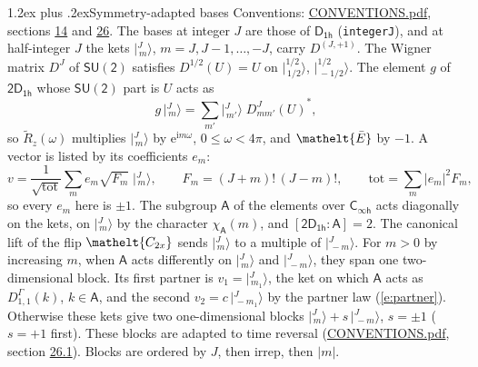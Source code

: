 \documentclass[10pt,a4paper]{article}
\makeatletter
\renewcommand\section{\@startsection{section}{1}{\z@}{-3ex plus -1ex minus -.2ex}%
  {1.2ex plus .2ex}{\normalfont\large\sffamily\bfseries\color{parttitle}}}
\numberwithin{equation}{section}
\newcommand{\eltfont}[1]{{\let\sigma\eltsigma\mathelt{#1}}}
\newcommand{\grp}[1]{\mathsf{#1}}
\newcommand{\elt}[1]{\eltfont{#1}}
\newcommand{\grpindex}[2]{[#1 : #2]}
\newcommand{\iunit}{\mathrm{i}}
\newcommand{\expe}{\mathrm{e}}
\newcommand{\irrJp}[2]{D^{(#1,#2)}}
\newcommand{\repD}[1]{D^{#1}}
\newcommand{\wignerD}[1]{D^{#1}}
\newcommand{\chiA}{\chi_{\grp{A}}}
\newcommand{\conj}[1]{{#1}^{*}}
\newcommand{\jm}[2]{\bigl\lvert{}^{#1}_{\,#2}\bigr\rangle}
\newcommand{\barred}[1]{\bar{#1}}
\newcommand{\lift}[1]{\tilde{#1}}
\makeatother
\begin{document}
\section{Symmetry-adapted bases}\label{s:bases}
Conventions: \href{../../CONVENTIONS.pdf}{CONVENTIONS.pdf}, sections \href{../../../rotation/CONVENTIONS.pdf\#conv.14}{14} and \href{../../CONVENTIONS.pdf\#conv.26}{26}.
\leavevmode\label{n:index.m}\label{n:vector.ket}The bases at integer $J$ are those of \href{../../../rotation/data/pdf/D1h.pdf}{$\grp{D_{1h}}$} (\texttt{integerJ}), and at half-integer $J$ the kets $\jm{J}{m}$, $m = J, J-1, \dots, -J$, carry $\irrJp{J}{+1}$. \label{n:matrix.wigner}The Wigner matrix $\wignerD{J}$ of $\grp{SU(2)}$ satisfies $\wignerD{1/2}(U) = U$ on $\jm{1/2}{1/2}$, $\jm{1/2}{-1/2}$. The element $g$ of $\grp{2D_{1h}}$ whose $\grp{SU(2)}$ part is $U$ acts as
\begin{equation}\label{e:action}g\,\jm{J}{m} = \sum_{m'} \jm{J}{m'}\; \conj{\wignerD{J}_{m m'}(U)},\end{equation}
so $\lift{R}_{z}(\omega)$ multiplies $\jm{J}{m}$ by $\expe^{\iunit m\omega}$, $0 \le \omega < 4\pi$, and $\elt{\barred{E}}$ by $-1$. \label{n:index.ketcoefficient}\label{n:vector.basis.symmetry}\label{n:index.ketweight}\label{n:index.total}A vector is listed by its coefficients $e_m$:
\begin{equation}\label{e:ket}v = \frac{1}{\sqrt{\mathrm{tot}}}\sum_m e_m\sqrt{F_m}\;\jm{J}{m},\qquad F_m = (J+m)!\,(J-m)!,\qquad \mathrm{tot} = \sum_m |e_m|^2F_m,\end{equation}
so every $e_m$ here is $\pm 1$.
\leavevmode\label{n:group.A}\label{n:function.character.abelian}The subgroup $\grp{A}$ of the elements over $\grp{C_{\infty h}}$ acts diagonally on the kets, on $\jm{J}{m}$ by the character $\chiA(m)$, and $\grpindex{\grp{2D_{1h}}}{\grp{A}} = 2$. The canonical lift of the flip $\elt{C_{2x}}$ sends $\jm{J}{m}$ to a multiple of $\jm{J}{-m}$. For $m > 0$ by increasing $m$, when $\grp{A}$ acts differently on $\jm{J}{m}$ and $\jm{J}{-m}$, they span one two-dimensional block. \label{n:index.partner.sign}Its first partner is $v_1 = \jm{J}{m_1}$, the ket on which $\grp{A}$ acts as $\repD{\Gamma}_{1,1}(k)$, $k \in \grp{A}$, and the second $v_2 = c\,\jm{J}{-m_1}$ by the partner law (\ref{e:partner}). \label{n:index.pair.sign}Otherwise these kets give two one-dimensional blocks $\jm{J}{m} + s\,\jm{J}{-m}$, $s = \pm 1$ ($s = +1$ first). These blocks are adapted to time reversal (\href{../../CONVENTIONS.pdf}{CONVENTIONS.pdf}, section \href{../../CONVENTIONS.pdf\#conv.26.1}{26.1}). Blocks are ordered by $J$, then irrep, then $|m|$.
\end{document}
